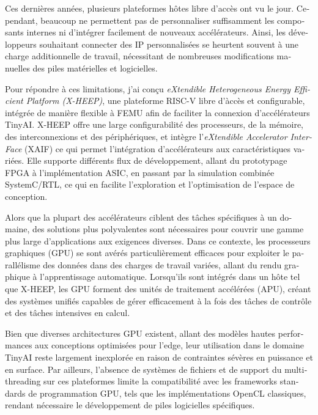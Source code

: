 \begin{otherlanguage}{french}
    Ces dernières années, plusieurs plateformes hôtes libre d'accès ont vu le jour. Cependant, beaucoup ne permettent pas de personnaliser suffisamment les composants internes ni d’intégrer facilement de nouveaux accélérateurs. Ainsi, les développeurs souhaitant connecter des IP personnalisées se heurtent souvent à une charge additionnelle de travail, nécessitant de nombreuses modifications manuelles des piles matérielles et logicielles.
    
    Pour répondre à ces limitations, j’ai conçu \textit{eXtendible Heterogeneous Energy Efficient Platform (X-HEEP)}, une plateforme RISC-V libre d'àccès et configurable, intégrée de manière flexible à \mbox{FEMU} afin de faciliter la connexion d’accélérateurs \mbox{TinyAI}. X-HEEP offre une large configurabilité des processeurs, de la mémoire, des interconnexions et des périphériques, et intègre l’\textit{eXtendible Accelerator InterFace} (XAIF) ce qui permet l’intégration d’accélérateurs aux caractéristiques variées. Elle supporte différents flux de développement, allant du prototypage FPGA à l’implémentation ASIC, en passant par la simulation combinée SystemC/RTL, ce qui en facilite l'exploration et l'optimisation de l’espace de conception.

    \thispagestyle{plain}
    Alors que la plupart des accélérateurs ciblent des tâches spécifiques à un domaine, des solutions plus polyvalentes sont nécessaires pour couvrir une gamme plus large d’applications aux exigences diverses. Dans ce contexte, les processeurs graphiques (GPU) se sont avérés particulièrement efficaces pour exploiter le parallélisme des données dans des charges de travail variées, allant du rendu graphique à l’apprentissage automatique. Lorsqu’ils sont intégrés dans un hôte tel que X-HEEP, les GPU forment des unités de traitement accélérées (APU), créant des systèmes unifiés capables de gérer efficacement à la fois des tâches de contrôle et des tâches intensives en calcul.
    
    Bien que diverses architectures GPU existent, allant des modèles hautes performances aux conceptions optimisées pour l’edge, leur utilisation dans le domaine \mbox{TinyAI} reste largement inexplorée en raison de contraintes sévères en puissance et en surface. Par ailleurs, l’absence de systèmes de fichiers et de support du multithreading sur ces plateformes limite la compatibilité avec les frameworks standards de programmation GPU, tels que les implémentations OpenCL classiques, rendant nécessaire le développement de piles logicielles spécifiques.
    

\end{otherlanguage}

